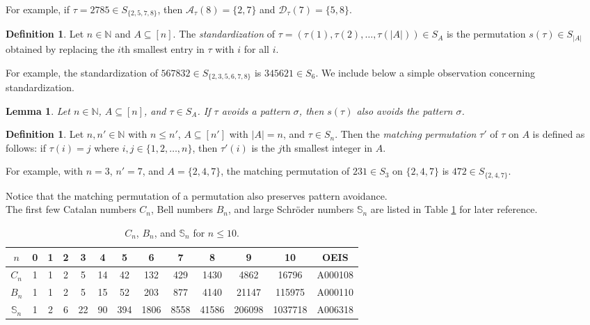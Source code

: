 \documentclass[11pt]{article}
\newtheorem{lemma}[theorem]{Lemma}
\theoremstyle{definition}
\newtheorem{definition}[theorem]{Definition}
\numberwithin{equation}{section}
\begin{document}
For example, if $\tau=2785\in S_{\{2,5,7,8\}}$, then $\mathcal{A}_\tau(8)=\{2,7\}$ 
and $\mathcal{D}_\tau(7)=\{5,8\}$.

\begin{definition}
Let $n\in\mathbb{N}$ and $A\subseteq[n]$. The \textit{standardization} of $\tau=(\tau(1),\tau(2),\ldots,\tau(|A|))\in S_A$ 
is the permutation $s(\tau)\in S_{|A|}$ obtained by replacing the $i$th smallest entry in $\tau$ 
with $i$ for all $i$.
\end{definition}

For example, the standardization of $567832\in S_{\{2,3,5,6,7,8\}}$ is $345621\in S_6$. We include below a simple observation concerning standardization. 
\begin{lemma}\label{Lemma:StandardizationPreservesPatternAvoidance}
    Let $n\in\mathbb{N}$, $A\subseteq[n]$, and $\tau\in S_A$. If $\tau$ avoids a pattern $\sigma$, 
then $s(\tau)$ also avoids the 
pattern $\sigma$.
\end{lemma}

\begin{definition}
    Let $n,n'\in\mathbb{N}$ with $n\leq n'$, $A\subseteq[n']$ with $|A|=n$, and $\tau\in S_{n}$. Then the \textit{matching permutation} $\tau'$ of $\tau$ on $A$ is defined as follows: if $\tau(i)=j$ where $i,j\in\{1,2,\ldots,n\}$, then $\tau'(i)$ is the $j$th smallest integer in $A$.
\end{definition}

For example, with $n=3$, $n'=7$, and $A=\{2,4,7\}$, the matching permutation of $231\in S_3$ on $\{2,4,7\}$ is $472\in S_{\{2,4,7\}}$.

Notice that the matching permutation of a permutation also preserves pattern avoidance. \\

The first few Catalan numbers $C_n$, Bell numbers $B_n$, and large Schr\"{o}der 
numbers $\mathbb{S}_n$ are listed in Table \ref{first_table}
for later reference.
\begin{table}[H]
\centering
\begin{tabular}{|c||c|c|c|c|c|c|c|c|c|c|c|c|}
\hline
$n$&0&1&2&3&4&5&6&7&8&9&10&OEIS \cite{OEIS}\\\hline\hline$C_n$&1&1&2&5&14&42&132&429&1430&4862&16796&A000108\\\hline
$B_n$&1&1&2&5&15&52&203&877&4140&21147&115975&A000110\\\hline
$\mathbb{S}_n$&1&2&6&22&90&394&1806&8558&41586&206098&1037718&A006318\\\hline

\end{tabular}
\caption{$C_n$, $B_n$, and $\mathbb{S}_n$ for $n\leq 10$.}
\label{first_table}
\end{table}
\end{document}
